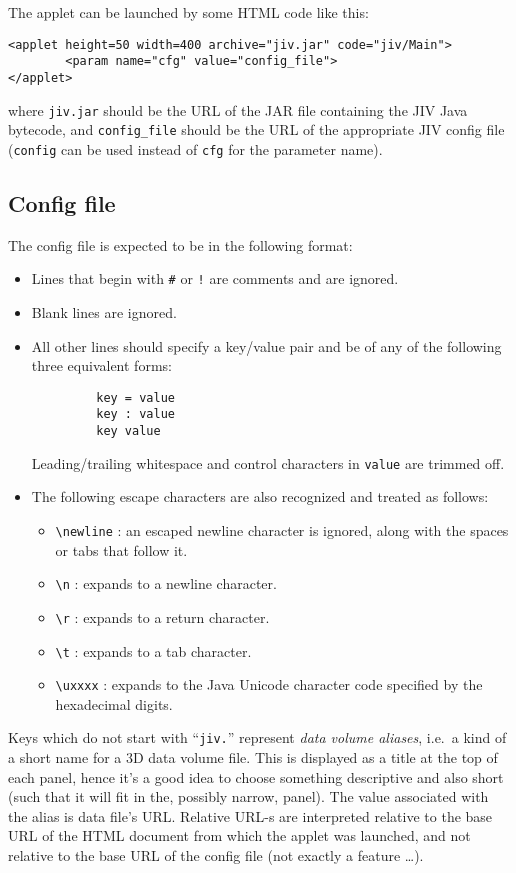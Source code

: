 The applet can be launched by some HTML code like this:
\begin{verbatim}
<applet height=50 width=400 archive="jiv.jar" code="jiv/Main">
        <param name="cfg" value="config_file">
</applet>
\end{verbatim}
where \verb+jiv.jar+ should be the URL of the JAR file containing the
JIV Java bytecode, and \verb+config_file+ should be the URL of the
appropriate JIV config file (\verb+config+ can be used instead of
\verb+cfg+ for the parameter name).


\subsection{Config file}
\label{sec:config-file}

The config file is expected to be in the following format:
\begin{itemize}
\item Lines that begin with \verb|#| or \verb|!| are comments and are
  ignored. 
\item Blank lines are ignored.
\item All other lines should specify a key/value pair and be of any of
  the following three equivalent forms:
\begin{verbatim}
         key = value
         key : value
         key value
\end{verbatim}
  Leading/trailing whitespace and control characters in \verb|value|
  are trimmed off.
\item The following escape characters are also recognized and
  treated as follows: 
  \begin{itemize}
  \item \verb|\newline| : 
    an escaped newline character is ignored, along with the spaces or
    tabs that follow it. 
  \item \verb|\n| : expands to a newline character.
  \item \verb|\r| : expands to a return character.
  \item \verb|\t| : expands to a tab character.
  \item \verb|\uxxxx| : expands to the Java Unicode character code
    specified by the hexadecimal digits.  
  \end{itemize}
\end{itemize} 

Keys which do not start with ``\verb+jiv.+'' represent {\em data
  volume aliases}, i.e.\ a kind of a short name for a 3D data volume
file. This is displayed as a title at the top of each panel, hence
it's a good idea to choose something descriptive and also short (such
that it will fit in the, possibly narrow, panel). The value associated
with the alias is data file's URL\@. Relative URL-s are interpreted
relative to the base URL of the HTML document from which the applet
was launched, and not relative to the base URL of the config file (not
exactly a feature \ldots).

